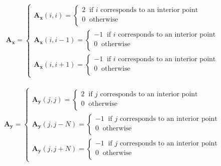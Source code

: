 \documentclass[12 pt, final]{article}
\begin{document}
\begin{itemize}
\begin{itemize}
            \begin{align*}
                    \mathbf{A_x} = \begin{cases}
                    \mathbf{A_x}(i,i) =
                    \begin{cases}
                    2 \: \text{ if $i$ corresponds to an interior point}\:\\
                    0 \: \text{ otherwise}\:\\
                    \end{cases}\\
                    \mathbf{A_x}(i,i-1) =
                    \begin{cases}
                    -1 \: \text{ if $i$ corresponds to an interior point}\:\\
                    0 \: \text{ otherwise}\:\\
                    \end{cases}\\
                    \mathbf{A_x}(i,i+1) =
                    \begin{cases}
                    -1 \: \text{ if $i$ corresponds to an interior point}\:\\
                    0 \: \text{ otherwise}\:\\
                    \end{cases}
                    \end{cases}
            \end{align*}

   
            
            \begin{align*}
                    \mathbf{A_y} = \begin{cases}
                    \mathbf{A_y}(j,j) =
                    \begin{cases}
                    2 \: \text{ if $j$ corresponds to an interior point}\:\\
                    0 \: \text{ otherwise}\:\\
                    \end{cases}\\
                    \mathbf{A_y}(j,j-N) =
                    \begin{cases}
                    -1 \: \text{ if $j$ corresponds to an interior point}\:\\
                    0 \: \text{ otherwise}\:\\
                    \end{cases}\\
                    \mathbf{A_y}(j,j+N) =
                    \begin{cases}
                    -1 \: \text{ if $j$ corresponds to an interior point}\:\\
                    0 \: \text{ otherwise}\:\\
                    \end{cases}
                    \end{cases}
            \end{align*}


\end{itemize}
\end{itemize}
\end{document}
